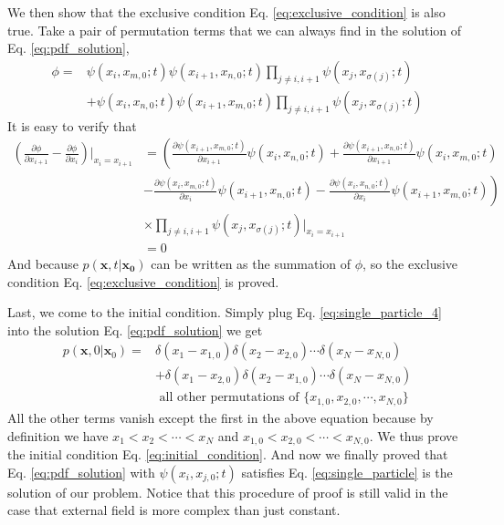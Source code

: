 \documentclass[12pt,a4paper]{article}
\begin{document}
We then show that the exclusive condition Eq. \eqref{eq:exclusive_condition}
is also true. Take a pair of permutation terms that we can always find in the
solution of Eq. \eqref{eq:pdf_solution}, 
\begin{align*}
    \phi = & \psi(x_i, x_{m,0};t)\psi(x_{i+1}, x_{n,0};t)
    \prod_{j\neq i,i+1} \psi(x_j, x_{\sigma(j)};t)  \\
    & + \psi(x_i, x_{n,0};t)\psi(x_{i+1}, x_{m,0};t)\prod_{j\neq i,i+1} 
    \psi(x_j, x_{\sigma(j)};t)
\end{align*}
It is easy to verify that
\begin{align*}
    \left(\frac{\partial \phi}{\partial x_{i+1}} - \frac{\partial \phi}{\partial
            x_{i}}\right)\Bigg|_{x_i = x_{i+1}} & =  
    \left(\frac{\partial\psi(x_{i+1}, x_{m,0};t)}{\partial x_{i+1}}\psi(x_{i},
        x_{n,0};t) + \frac{\partial\psi(x_{i+1}, x_{n,0};t)}{\partial
            x_{i+1}}\psi(x_{i}, x_{m,0};t)\right. \\ 
    &\left. - \frac{\partial\psi(x_i, x_{m,0};t)}{\partial x_i}\psi(x_{i+1},
        x_{n,0};t) - \frac{\partial\psi(x_i, x_{n,0};t)}{\partial
            x_i}\psi(x_{i+1}, x_{m,0};t)\right) \\ 
    & \times\prod_{j\neq i,i+1}\psi(x_j, x_{\sigma(j)};t)\Bigg|_{x_i = x_{i+1}} \\
    & = 0 
\end{align*}
And because $p(\mathbf{x}, t | \mathbf{x_0})$ can be written as the summation of
$\phi$, so the exclusive condition Eq. \eqref{eq:exclusive_condition} is proved.

Last, we come to the initial condition. Simply plug Eq.
\eqref{eq:single_particle_4} into the solution Eq. \eqref{eq:pdf_solution} we get
\begin{align*}
    p(\mathbf{x}, 0 | \mathbf{x}_0) = & 
    \delta(x_1-x_{1,0})\delta(x_2-x_{2,0})\cdots\delta(x_N-x_{N,0}) \\
    & + \delta(x_1-x_{2,0})\delta(x_2-x_{1,0})\cdots\delta(x_N-x_{N,0}) \\
    & \text{ all other permutations of } \{x_{1,0}, x_{2,0}, \cdots, x_{N,0}\}
\end{align*}
All the other terms vanish except the first in the above equation because by
definition we have $x_{1}<x_{2}<\cdots<x_{N}$ and $x_{1,0}<x_{2,0}<\cdots<x_{N,0}$.  
We thus prove the initial condition Eq. \eqref{eq:initial_condition}. And now we
finally proved that Eq. \eqref{eq:pdf_solution} with $\psi(x_i, x_{j,0};t)$
satisfies Eq.  \eqref{eq:single_particle} is the solution of our problem.
Notice that this procedure of proof is still valid in the case that external
field is more complex than just constant.
\end{document}
